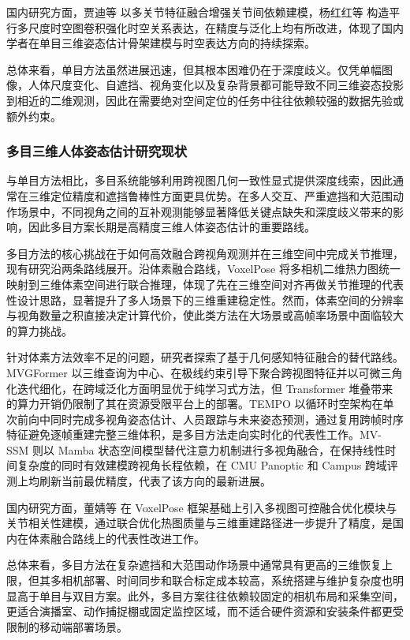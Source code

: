 国内研究方面，贾迪等 以多关节特征融合增强关节间依赖建模，杨红红等 构造平行多尺度时空图卷积强化时空关系表达，在精度与泛化上均有所改进，体现了国内学者在单目三维姿态估计骨架建模与时空表达方向的持续探索。

总体来看，单目方法虽然进展迅速，但其根本困难仍在于深度歧义。仅凭单幅图像，人体尺度变化、自遮挡、视角变化以及复杂背景都可能导致不同三维姿态投影到相近的二维观测，因此在需要绝对空间定位的任务中往往依赖较强的数据先验或额外约束。

\subsubsection{多目三维人体姿态估计研究现状}
与单目方法相比，多目系统能够利用跨视图几何一致性显式提供深度线索，因此通常在三维定位精度和遮挡鲁棒性方面更具优势。在多人交互、严重遮挡和大范围动作场景中，不同视角之间的互补观测能够显著降低关键点缺失和深度歧义带来的影响，因此多目方案长期是高精度三维人体姿态估计的重要路线。

多目方法的核心挑战在于如何高效融合跨视角观测并在三维空间中完成关节推理，现有研究沿两条路线展开。沿体素融合路线，VoxelPose 将多相机二维热力图统一映射到三维体素空间进行联合推理，体现了先在三维空间对齐再做关节推理的代表性设计思路，显著提升了多人场景下的三维重建稳定性。然而，体素空间的分辨率与视角数量之积直接决定计算代价，使此类方法在大场景或高帧率场景中面临较大的算力挑战。

针对体素方法效率不足的问题，研究者探索了基于几何感知特征融合的替代路线。MVGFormer 以三维查询为中心、在极线约束引导下聚合跨视图特征并以可微三角化迭代细化，在跨域泛化方面明显优于纯学习式方法，但 Transformer 堆叠带来的算力开销仍限制了其在资源受限平台上的部署。TEMPO 以循环时空架构在单次前向中同时完成多视角姿态估计、人员跟踪与未来姿态预测，通过复用跨帧时序特征避免逐帧重建完整三维体积，是多目方法走向实时化的代表性工作。MV-SSM 则以 Mamba 状态空间模型替代注意力机制进行多视角融合，在保持线性时间复杂度的同时有效建模跨视角长程依赖，在 CMU Panoptic 和 Campus 跨域评测上均刷新当前最优精度，代表了该方向的最新进展。

国内研究方面，董婧等 在 VoxelPose 框架基础上引入多视图可控融合优化模块与关节相关性建模，通过联合优化热图质量与三维重建路径进一步提升了精度，是国内在体素融合路线上的代表性改进工作。

总体来看，多目方法在复杂遮挡和大范围动作场景中通常具有更高的三维恢复上限，但其多相机部署、时间同步和联合标定成本较高，系统搭建与维护复杂度也明显高于单目与双目方案。此外，多目方案往往依赖较固定的相机布局和采集空间，更适合演播室、动作捕捉棚或固定监控区域，而不适合硬件资源和安装条件都更受限制的移动端部署场景。
